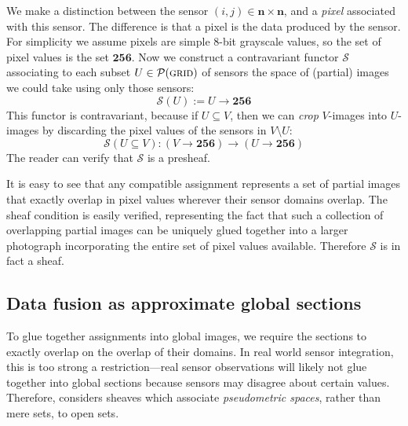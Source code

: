 We make a distinction between the sensor $(i, j) \in \mathbf{n} \times \mathbf{n}$, and a \emph{pixel} associated with this sensor. The difference is that a pixel is the data produced by the sensor. For simplicity we assume pixels are simple 8-bit grayscale values, so the set of pixel values is the set $\mathbf{256}$. Now we construct a contravariant functor $\mathcal{S}$ associating to each subset $U \in \mathcal{P}(\textsc{grid})$ of sensors the space of (partial) images we could take using only those sensors:
\[\mathcal{S}(U) := U \to \mathbf{256}
\]
This functor is contravariant, because if $U \subseteq V$, then we can \emph{crop} $V$-images into $U$-images by discarding the pixel values of the sensors in $V \setminus U$:
\[ \mathcal{S}\left(U \subseteq V \right) : \left(V \to \mathbf{256}\right) \to \left(U \to \mathbf{256}\right)\]
The reader can verify that $\mathcal{S}$ is a presheaf.

It is easy to see that any compatible assignment represents a set of partial images that exactly overlap in pixel values wherever their sensor domains overlap. The sheaf condition is easily verified, representing the fact that such a collection of overlapping partial images can be uniquely glued together into a larger photograph incorporating the entire set of pixel values available. Therefore $\mathcal{S}$ is in fact a sheaf.


\subsection{Data fusion as approximate global sections}

To glue together assignments into global images, we require the sections to exactly overlap on the overlap of their domains. In real world sensor integration, this is too strong a restriction---real sensor observations will likely not glue together into global sections because sensors may disagree about certain values. Therefore, \cite{2017robinsonCanonical} considers sheaves which associate \emph{pseudometric spaces}, rather than mere sets, to open sets.

